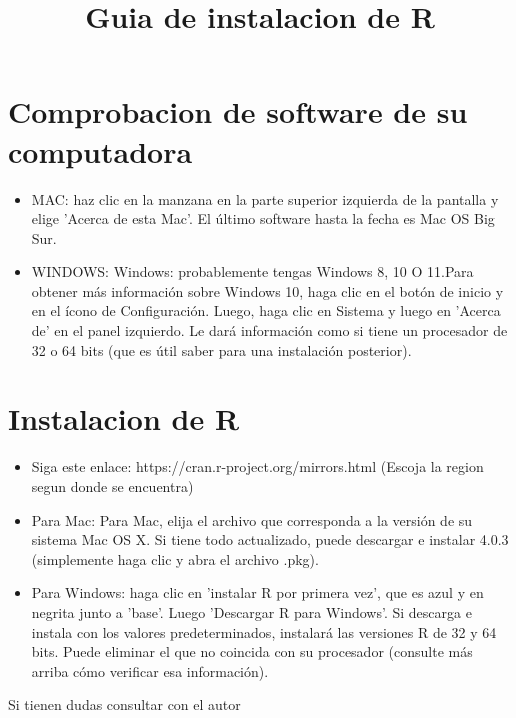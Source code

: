 \documentclass[12pt,hidelinks]{article}
\begin{document}
\title{Guia de instalacion de R}

\maketitle

\section{Comprobacion de software de su computadora}

\begin{itemize}
\item MAC: haz clic en la manzana en la parte superior izquierda de la pantalla y elige 'Acerca de esta Mac'. El último software hasta la fecha es Mac OS Big Sur. 
\item WINDOWS: Windows: probablemente tengas Windows 8, 10 O 11.Para obtener más información sobre Windows 10, haga clic en el botón de inicio y en el ícono de Configuración. Luego, haga clic en Sistema y luego en 'Acerca de' en el panel izquierdo. Le dará información como si tiene un procesador de 32 o 64 bits (que es útil saber para una instalación posterior).
\end{itemize}

\section{Instalacion de R}
\begin{itemize}

\item Siga este enlace: https://cran.r-project.org/mirrors.html (Escoja la region segun donde se encuentra)
\item Para Mac: Para Mac, elija el archivo que corresponda a la versión de su sistema Mac OS X. Si tiene todo actualizado, puede descargar e instalar 4.0.3 (simplemente haga clic y abra el archivo .pkg).
\item Para Windows: haga clic en 'instalar R por primera vez', que es azul y en negrita junto a 'base'. Luego 'Descargar R para Windows'. Si descarga e instala con los valores predeterminados, instalará las versiones R de 32 y 64 bits. Puede eliminar el que no coincida con su procesador (consulte más arriba cómo verificar esa información).

\end{itemize}

Si tienen dudas consultar con el autor
\end{document}
